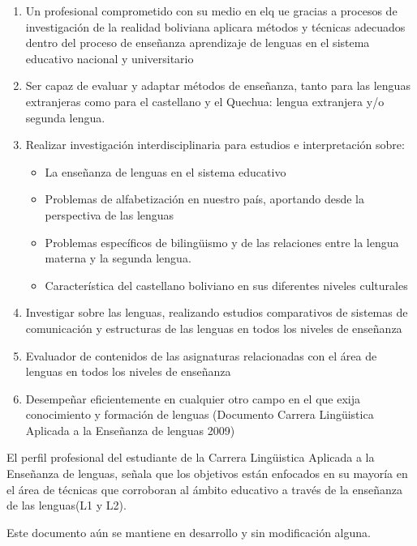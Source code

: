 \begin{enumerate}

\item Un profesional comprometido con su medio en elq ue gracias a procesos de
investigaci\'{o}n de la realidad boliviana aplicara m\'{e}todos y t\'{e}cnicas
adecuados dentro del proceso de ense\~{n}anza aprendizaje de lenguas en el 
sistema educativo nacional y universitario
\item Ser capaz de evaluar y adaptar m\'{e}todos de ense\~{n}anza, tanto para
las lenguas extranjeras como para el castellano y el Quechua: lengua extranjera
y/o segunda lengua.
\item Realizar investigaci\'{o}n interdisciplinaria para estudios e 
interpretaci\'{o}n sobre:
	\begin{itemize}
	
	\item La ense\~{n}anza de lenguas en el sistema educativo
	\item Problemas de alfabetizaci\'{o}n en nuestro pa\'{i}s, aportando desde la
	perspectiva de las lenguas
	\item Problemas espec\'{i}ficos de biling\"{u}ismo y de las relaciones entre 
	la lengua materna y la segunda lengua.
	\item Caracter\'{i}stica del castellano boliviano en sus diferentes niveles
	culturales
	
	\end{itemize}
\item Investigar sobre las lenguas, realizando estudios comparativos de sistemas
de comunicaci\'{o}n y estructuras de las lenguas en todos los niveles de 
ense\~{n}anza
\item Evaluador de contenidos de las asignaturas relacionadas con el \'{a}rea de
lenguas en todos los niveles de ense\~{n}anza
\item Desempe\~{n}ar eficientemente en cualquier otro campo en el que exija 
conocimiento y formaci\'{o}n de lenguas (Documento Carrera Ling\"{u}istica 
Aplicada a la Ense\~{n}anza de lenguas 2009)

\end{enumerate}

El perfil profesional del estudiante de la Carrera Ling\"{u}istica Aplicada a la
Ense\~{n}anza de lenguas, se\~{n}ala que los objetivos est\'{a}n enfocados en su
mayor\'{i}a en el \'{a}rea de t\'{e}cnicas que corroboran al \'{a}mbito educativo
a trav\'{e}s de la ense\~{n}anza de las lenguas(L1 y L2).

Este documento a\'{u}n se mantiene en desarrollo y sin modificaci\'{o}n alguna.
\cite{Q2014}

